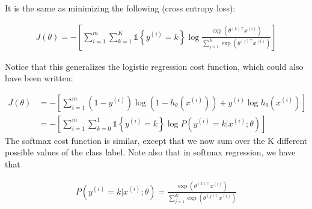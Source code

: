 It is the same as minimizing the following (cross entropy loss):

\begin{align} 
	J(\theta) = - \left[ \sum_{i=1}^{m} \sum_{k=1}^{K} \mathds{1}\left\{y^{(i)} = k\right\} \log \frac{\exp(\theta^{(k)\top} x^{(i)})}{\sum_{j=1}^K \exp(\theta^{(j)\top} x^{(i)})}\right] 
\end{align}

Notice that this generalizes the logistic regression cost function, which could also have been written:

\begin{align}
	J(\theta) &= - \left[ \sum_{i=1}^m (1-y^{(i)}) \log (1-h_\theta(x^{(i)})) + y^{(i)} \log h_\theta(x^{(i)}) \right] \\ 
			  &= - \left[ \sum_{i=1}^{m} \sum_{k=0}^{1} \mathds{1}\left\{y^{(i)} = k\right\} \log P(y^{(i)} = k | x^{(i)} ; \theta) \right] 
\end{align}
The softmax cost function is similar, except that we now sum over the K different possible values of the class label. Note also that in softmax regression, we have that

\begin{align}
	P(y^{(i)} = k | x^{(i)} ; \theta) = \frac{\exp(\theta^{(k)\top} x^{(i)})}{\sum_{j=1}^K \exp(\theta^{(j)\top} x^{(i)}) }
\end{align}

